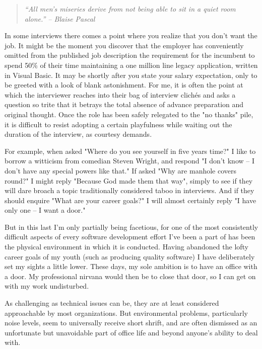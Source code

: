 \documentclass{article}
\begin{document}
\begin{quote}
\emph{“All men's miseries derive from not being able to sit in a quiet room
alone.” -- Blaise Pascal}
\end{quote}

In some interviews there comes a point where you realize that you don't
want the job. It might be the moment you discover that the employer has
conveniently omitted from the published job description the requirement
for the incumbent to spend 50\% of their time maintaining a one million
line legacy application, written in Visual Basic. It may be shortly
after you state your salary expectation, only to be greeted with a look
of blank astonishment. For me, it is often the point at which the
interviewer reaches into their bag of interview clichés and asks a
question so trite that it betrays the total absence of advance
preparation and original thought. Once the role has been safely
relegated to the "no thanks" pile, it is difficult to resist adopting a
certain playfulness while waiting out the duration of the interview, as
courtesy demands.

For example, when asked "Where do you see yourself in five years time?"
I like to borrow a witticism from comedian Steven Wright, and respond "I
don't know -- I don't have any special powers like that." If asked "Why
are manhole covers round?" I might reply "Because God made them that
way", simply to see if they will dare broach a topic traditionally
considered taboo in interviews. And if they should enquire "What are
your career goals?" I will almost certainly reply "I have only one -- I
want a door."

But in this last I'm only partially being facetious, for one of the most
consistently difficult aspects of every software development effort I've
been a part of has been the physical environment in which it is
conducted. Having abandoned the lofty career goals of my youth (such as
producing quality software) I have deliberately set my sights a little
lower. These days, my sole ambition is to have an office with a door. My
professional nirvana would then be to close that door, so I can get on
with my work undisturbed.

As challenging as technical issues can be, they are at least considered
approachable by most organizations. But environmental problems,
particularly noise levels, seem to universally receive short shrift, and
are often dismissed as an unfortunate but unavoidable part of office
life and beyond anyone's ability to deal with.
\end{document}
